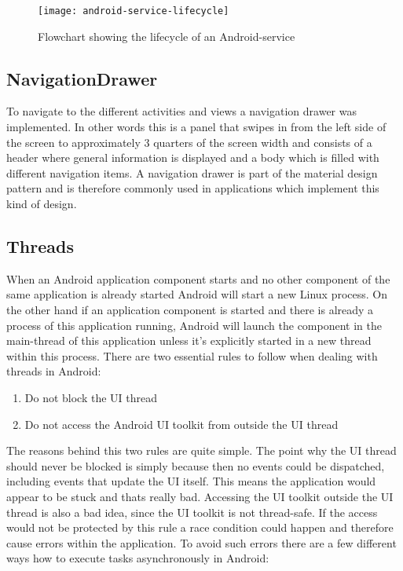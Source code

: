\begin{figure}[H]
	\centering
	\texttt{[image: android-service-lifecycle]}
	\caption{Flowchart showing the lifecycle of an Android-service}
	\label{fig:servicelifecycle}
\end{figure}

\subsection{NavigationDrawer}
To navigate to the different activities and views a navigation drawer was implemented. In other words this is a panel that swipes in from the left side of the screen to approximately 3 quarters of the screen width and consists of a header where general information is displayed and a body which is filled with different navigation items. A navigation drawer is part of the material design pattern and is therefore commonly used in applications which implement this kind of design.

\subsection{Threads}
When an Android application component starts and no other component of the same application is already started Android will start a new Linux process. On the other hand if an application component is started and there is already a process of this application running, Android will launch the component in the main-thread of this application unless it's explicitly started in a new thread within this process. There are two essential rules to follow when dealing with threads in Android:

\begin{enumerate}
	\item Do not block the UI thread
	\item Do not access the Android UI toolkit from outside the UI thread
\end{enumerate}

\noindent The reasons behind this two rules are quite simple. The point why the UI thread should never be blocked is simply because then no events could be dispatched, including events that update the UI itself. This means the application would appear to be stuck and thats really bad. Accessing the UI toolkit outside the UI thread is also a bad idea, since the UI toolkit is not thread-safe. If the access would not be protected by this rule a race condition could happen and therefore cause errors within the application. To avoid such errors there are a few different ways how to execute tasks asynchronously in Android:

